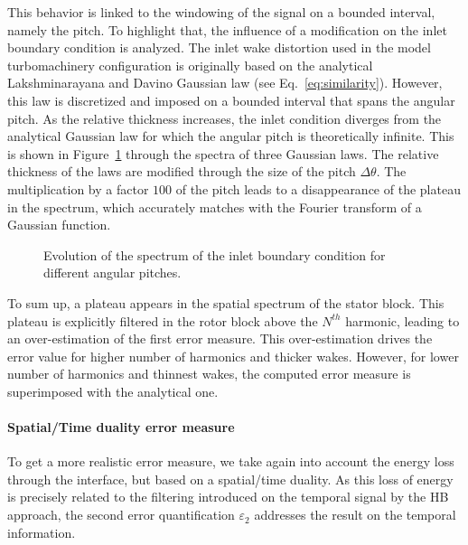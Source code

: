 This behavior is linked to the windowing of the signal on 
a bounded interval, namely the pitch. To highlight that, the influence of 
a modification on the inlet boundary condition is analyzed.
The inlet wake distortion used in the model turbomachinery configuration is 
originally based on the analytical Lakshminarayana and Davino 
Gaussian law (see Eq.~\eqref{eq:similarity}). However, 
this law is discretized and imposed on a bounded interval 
that spans the angular pitch. As the relative thickness 
increases, the inlet condition diverges from the analytical 
Gaussian law for which the angular pitch is theoretically 
infinite. This is shown in Figure~\ref{fig:inlet_law_fft} 
through the spectra of three Gaussian laws. The relative 
thickness of the laws are modified through the size 
of the pitch $\Delta \theta$. The multiplication by a factor $100$ 
of the pitch leads to a disappearance of the plateau 
in the spectrum, which accurately matches with the 
Fourier transform of a Gaussian function. 
\begin{figure}[htp]
  \centering
  \caption{Evolution of the spectrum of the inlet boundary condition for different angular pitches.}
  \label{fig:inlet_law_fft}
\end{figure}

To sum up, a plateau appears in the spatial spectrum of the
stator block. This plateau is explicitly filtered in the
rotor block above the $N^{th}$ harmonic, leading to an over-estimation of the 
first error measure. This over-estimation drives the error value
for higher number of harmonics and thicker wakes.
However, for lower number of harmonics and thinnest wakes, 
the computed error measure is superimposed with 
the analytical one.

\FloatBarrier

\paragraph{Spatial/Time duality error measure}
To get a more realistic error measure, we take 
again into account the energy loss
through the interface, but based on a spatial/time duality. 
As this loss of energy is 
precisely related to the filtering 
introduced on the temporal signal by the HB approach, the second 
error quantification $\varepsilon_2$ addresses the result on 
the temporal information. 


